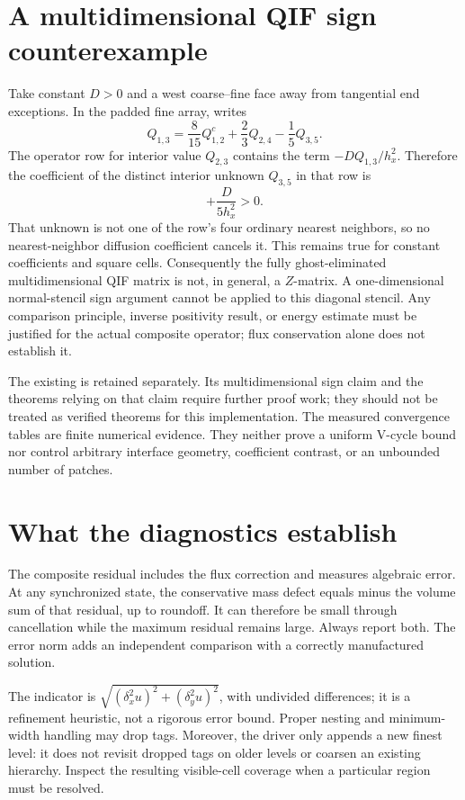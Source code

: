 \section{A multidimensional QIF sign counterexample}
Take constant $D>0$ and a west coarse--fine face away from tangential
end exceptions.  In the padded fine array,  writes
\[
 Q_{1,3}=\frac8{15}Q^c_{1,2}+\frac23Q_{2,4}-\frac15Q_{3,5}.
\]
The operator row for interior value $Q_{2,3}$ contains the term
$-D Q_{1,3}/h_x^2$.  Therefore the coefficient of the distinct interior
unknown $Q_{3,5}$ in that row is
\[
  +\frac{D}{5h_x^2}>0.
\]
That unknown is not one of the row's four ordinary nearest neighbors,
so no nearest-neighbor diffusion coefficient cancels it.  This remains
true for constant coefficients and square cells.  Consequently the
fully ghost-eliminated multidimensional QIF matrix is not, in general,
a $Z$-matrix.  A one-dimensional normal-stencil sign argument cannot be
applied to this diagonal stencil.  Any comparison principle, inverse
positivity result, or energy estimate must be justified for the actual
composite operator; flux conservation alone does not establish it.

The existing  is retained separately.
Its multidimensional sign claim and the theorems relying on that claim
require further proof work; they should not be treated as verified
theorems for this implementation.  The measured convergence tables are
finite numerical evidence.  They neither prove a uniform V-cycle bound
nor control arbitrary interface geometry, coefficient contrast, or an
unbounded number of patches.

\section{What the diagnostics establish}
The composite residual includes the flux correction and measures
algebraic error.  At any synchronized state, the conservative mass
defect equals minus the volume sum of that residual, up to roundoff.
It can therefore be small through cancellation while the maximum
residual remains large.  Always report both.  The error norm adds an
independent comparison with a correctly manufactured solution.

The  indicator is
$\sqrt{(\delta_x^2u)^2+(\delta_y^2u)^2}$, with undivided differences;
it is a refinement heuristic, not a rigorous error bound.  Proper
nesting and minimum-width handling may drop tags.  Moreover, the driver
only appends a new finest level: it does not revisit dropped tags on
older levels or coarsen an existing hierarchy.  Inspect the resulting
visible-cell coverage when a particular region must be resolved.

